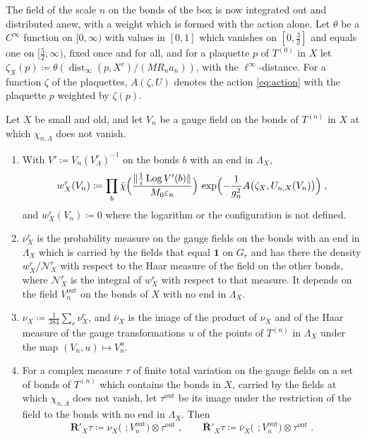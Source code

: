 \documentclass[11pt]{preprint}
\makeatletter
\newcommand{\id}{\mathbf 1}
\newcommand{\dist}{\operatorname{dist}}
\DeclarePairedDelimiter{\norm}{\lVert}{\rVert}
\newcommand*{\bigcdot}{}%
\DeclareRobustCommand*{\bigcdot}{%
	\mathbin{\mathpalette\bigcdot@{}}%
}
\newcommand*{\bigcdot@scalefactor}{.7}
\newcommand*{\bigcdot@widthfactor}{1.15}
\newcommand*{\bigcdot@}[2]{%
	\sbox0{$#1\vcenter{}$}%
	\sbox2{$#1\cdot\m@th$}%
	\hbox to \bigcdot@widthfactor\wd2{%
		\hss
		\raise\ht0\hbox{%
			\scalebox{\bigcdot@scalefactor}{%
				\lower\ht0\hbox{$#1\bullet\m@th$}%
			}%
		}%
		\hss
	}%
}
\numberwithin{equation}{section}
\makeatother
\begin{document}
The field of the scale $n$ on the bonds of the box is now integrated out and distributed anew, with a weight which is formed with the action alone. Let $\theta$ be a $C^\infty$ function on $[0, \infty)$ with values in $[0, 1]$ which vanishes on $[0, \frac{3}{2}]$ and equals one on $[\frac{5}{2}, \infty)$, fixed once and for all, and for a plaquette $p$ of $T^{(0)}$ in $X$ let $\zeta_X(p) \coloneqq \theta(\dist_\infty(p, X^c)/(MR_na_n))$, with the $\ell^\infty$-distance. For a function $\zeta$ of the plaquettes, $A(\zeta, U)$ denotes the action \eqref{eq:action} with the plaquette $p$ weighted by $\zeta(p)$.

\begin{definition}\label{def:box-weight}
Let $X$ be small and old, and let $V_n$ be a gauge field on the bonds of $T^{(n)}$ in $X$ at which $\chi_{n,\Lambda}$ does not vanish.
\begin{enumerate}[label=(\roman*)]
\item With $V' \coloneqq V_n(V^r_\Lambda)^{-1}$ on the bonds $b$ with an end in $\Lambda_X$,
\begin{equation}\label{eq:box-weight}
    w^r_X(V_n) \coloneqq \prod_b\bar\chi\Bigl(\frac{\norm{\frac{1}{i}\operatorname{Log}V'(b)}}{M_0\varepsilon_n}\Bigr)\,\exp\Bigl(-\frac{1}{g_n^2}A\bigl(\zeta_X, U_{n,X}(V_n)\bigr)\Bigr)\;,
\end{equation}
and $w^r_X(V_n) \coloneqq 0$ where the logarithm or the configuration is not defined.
\item $\nu^r_X$ is the probability measure on the gauge fields on the bonds with an end in $\Lambda_X$ which is carried by the fields that equal $\id$ on $G_r$ and has there the density $w^r_X/\mathcal N^r_X$ with respect to the Haar measure of the field on the other bonds, where $\mathcal N^r_X$ is the integral of $w^r_X$ with respect to that measure. It depends on the field $V^{\mathrm{out}}_n$ on the bonds of $X$ with no end in $\Lambda_X$.
\item $\nu_X \coloneqq \frac{1}{384}\sum_r\nu^r_X$, and $\bar\nu_X$ is the image of the product of $\nu_X$ and of the Haar measure of the gauge transformations $u$ of the points of $T^{(n)}$ in $\Lambda_X$ under the map $(V_n, u) \mapsto V_n^u$.
\item For a complex measure $\tau$ of finite total variation on the gauge fields on a set of bonds of $T^{(n)}$ which contains the bonds in $X$, carried by the fields at which $\chi_{n,\Lambda}$ does not vanish, let $\tau^{\mathrm{out}}$ be its image under the restriction of the field to the bonds with no end in $\Lambda_X$. Then
\begin{equation}\label{eq:r-prime}
    \mathbf R'_X\tau \coloneqq \nu_X\bigl(\,\bigcdot\,; V^{\mathrm{out}}_n\bigr) \otimes \tau^{\mathrm{out}}\;,
    \qquad
    \bar{\mathbf R}'_X\tau \coloneqq \bar\nu_X\bigl(\,\bigcdot\,; V^{\mathrm{out}}_n\bigr) \otimes \tau^{\mathrm{out}}\;.
\end{equation}
\end{enumerate}
\end{definition}
\end{document}
